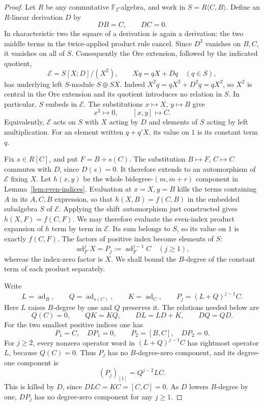 \documentclass[11pt]{article}
\newcommand{\F}{{\mathbb F_2}}
\DeclareMathOperator{\ad}{ad}
\theoremstyle{definition}
\theoremstyle{remark}
\numberwithin{equation}{section}
\begin{document}
\begin{proof}
Let $R$ be any commutative $\F$-algebra, and work in
$S=R\langle C,B\rangle$.  Define an $R$-linear derivation $D$ by
\[
 DB=C,\qquad DC=0.
\]
In characteristic two the square of a derivation is again a
derivation: the two middle terms in the twice-applied product rule
cancel.  Since $D^2$ vanishes on $B,C$, it vanishes on all of $S$.
Consequently the Ore extension, followed by the indicated quotient,
\[
 \mathcal E=S[X;D]/(X^2),\qquad Xq=qX+Dq\quad(q\in S),
\]
has underlying left $S$-module $S\oplus SX$.
Indeed $X^2q=qX^2+D^2q=qX^2$, so $X^2$ is central in the Ore
extension and its quotient introduces no relation in $S$.
In particular, $S$ embeds in $\mathcal E$.
The substitutions $x\mapsto X$, $y\mapsto B$ give
\[
 x^2\mapsto0,\qquad [x,y]\mapsto C.
\]
Equivalently, $\mathcal E$ acts on $S$ with $X$ acting by $D$
and elements of $S$ acting by left multiplication.
For an element written $q+q'X$, its value on $1$ is its constant
term $q$.

Fix $s\in R[C]$, and put $F=B+s(C)$.
The substitution $B\mapsto F$, $C\mapsto C$ commutes with $D$,
since $D(s)=0$.  It therefore extends to an automorphism of
$\mathcal E$ fixing $X$.
Let $h(x,y)$ be the whole bidegree-$(m,m+r)$ component in
Lemma~\ref{lem:even-indices}.  Evaluation at $x=X,y=B$ kills the
terms containing $A$ in its $A,C,B$ expression, so that
$h(X,B)=f(C,B)$ in the embedded subalgebra $S$ of $\mathcal E$.
Applying the shift automorphism just constructed gives
$h(X,F)=f(C,F)$.  We may therefore evaluate the even-index product
expansion of $h$ term by term in $\mathcal E$.  Its sum belongs to
$S$, so its value on $1$ is exactly $f(C,F)$.
The factors of positive index become elements of $S$:
\[
 \ad_F^jX=P_j:=\ad_F^{j-1}C\quad(j\geq1),
\]
whereas the index-zero factor is $X$.
We shall bound the $B$-degree of the constant term of each product
separately.

Write
\[
 L=\ad_B,\qquad Q=\ad_{s(C)},\qquad K=\ad_C,
 \qquad P_j=(L+Q)^{j-1}C.
\]
Here $L$ raises $B$-degree by one and $Q$ preserves it.
The relations needed below are
\[
 Q(C)=0,\qquad QK=KQ,\qquad DL=LD+K,\qquad DQ=QD.
\]
For the two smallest positive indices one has
\begin{equation}
 \label{eq:small-indices}
 P_1=C,\quad DP_1=0,\qquad
 P_2=[B,C],\quad DP_2=0.
\end{equation}
For $j\geq2$, every nonzero operator word in $(L+Q)^{j-1}C$
has rightmost operator $L$, because $Q(C)=0$.
Thus $P_j$ has no $B$-degree-zero component, and its degree-one
component is
\[
 (P_j)_{[1]}=Q^{j-2}LC.
\]
This is killed by $D$, since $DLC=KC=[C,C]=0$.
As $D$ lowers $B$-degree by one, $DP_j$ has no degree-zero
component for any $j\geq1$.


\end{proof}
\end{document}
